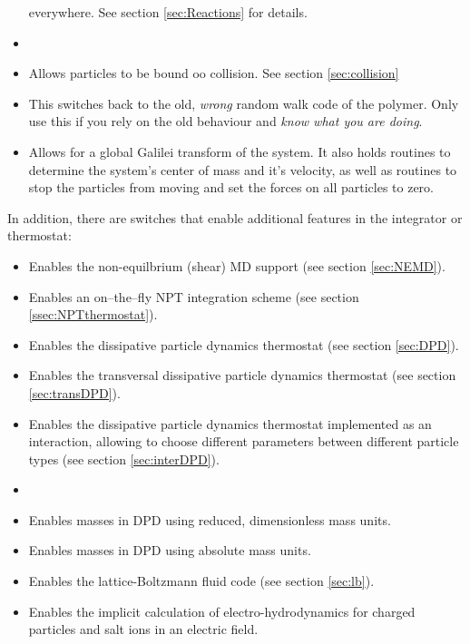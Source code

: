 \begin{itemize}
  everywhere. See section \ref{sec:Reactions} for details.
\item {}
\item {} Allows particles to be bound oo collision. See section \ref{sec:collision}
\item {} This switches back to the old,
  \emph{wrong} random walk code of the polymer. Only use this if you
  rely on the old behaviour and \emph{know what you are doing}.
\item {} Allows for a global Galilei transform of the system. It also holds routines to determine the system's center of mass and it's velocity, as well as routines to stop the particles from moving and set the forces on all particles to zero.
\end{itemize}

In addition, there are switches that enable additional features in the
integrator or thermostat:
\begin{itemize}
\item {} Enables the non-equilbrium (shear) MD support
  (see section \vref{sec:NEMD}).
\item {} Enables an on--the--fly NPT integration scheme
  (see section \vref{ssec:NPTthermostat}).
\item {} Enables the dissipative particle dynamics
  thermostat (see section \vref{sec:DPD}).
\item {} Enables the transversal dissipative
  particle dynamics thermostat (see section \vref{sec:transDPD}).
\item {} Enables the dissipative
  particle dynamics thermostat implemented as an interaction,
  allowing to choose different parameters between different particle
  types (see section \vref{sec:interDPD}).
\item {} 
\item {} Enables masses in DPD using reduced,
  dimensionless mass units.
\item {} Enables masses in DPD using absolute
  mass units.
\item {} Enables the lattice-Boltzmann fluid code (see
  section \vref{sec:lb}).
\item {} Enables the implicit
  calculation of electro-hydrodynamics for charged particles and salt
  ions in an electric field.
\end{itemize}

